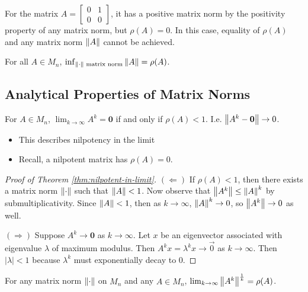 \begin{example}
For the matrix $A = \begin{bmatrix}0&1\\0&0\end{bmatrix}$, it has a positive matrix norm by the positivity property of any matrix norm, but $\rho(A) = 0$. In this case, equality of $\rho(A)$ and any matrix norm $\left\lVert A\right\rVert$ cannot be achieved.
\end{example}

\begin{corollary}
\label{cor:spectral-radius-infimum}
For all $A \in M_n$, $\inf_{\left\lVert\cdot\right\rVert \text{ matrix norm}} \left\lVert A\right\rVert = \rho(A)$.
\end{corollary}

\subsection{Analytical Properties of Matrix Norms}
\begin{theorem}
\label{thm:nilpotent-in-limit}
For $A \in M_n$, $\lim_{k\rightarrow\infty}A^k = \mathbf{0}$ if and only if $\rho(A) < 1$. I.e. $\left\lVert A^k-\mathbf{0}\right\rVert \rightarrow 0$.
\begin{itemize}
    \item This describes nilpotency in the limit
    \item Recall, a nilpotent matrix has $\rho(A) = 0$.
\end{itemize}
\end{theorem}
\begin{proof}[Proof of Theorem \ref{thm:nilpotent-in-limit}]
$(\Longleftarrow)$ If $\rho(A) < 1$, then there exists a matrix norm $\left\lVert\cdot\right\rVert$ such that $\left\lVert A\right\rVert < 1$. Now observe that $\left\lVert A^k\right\rVert \le \left\lVert A\right\rVert^k$ by submultiplicativity. Since $\left\lVert A\right\rVert < 1$, then as $k \rightarrow \infty$, $\left\lVert A\right\rVert^k \rightarrow 0$, so $\left\lVert A^k\right\rVert\rightarrow0$ as well.

$(\Longrightarrow)$ Suppose $A^k \rightarrow \mathbf{0}$ as $k\rightarrow \infty$. Let $x$ be an eigenvector associated with eigenvalue $\lambda$ of maximum modulus. Then $A^kx = \lambda^k x \rightarrow \Vec{0}$ as $k \rightarrow\infty$. Then $|\lambda| < 1$ because $\lambda^k$ must exponentially decay to 0.
\end{proof}

\begin{theorem}
\label{thm:limit-spectral-radius}
For any matrix norm $\left\lVert\cdot\right\rVert$ on $M_n$ and any $A \in M_n$, $\lim_{k\rightarrow\infty} \left\lVert A^k\right\rVert^{\frac1k} = \rho(A)$.
\end{theorem}

